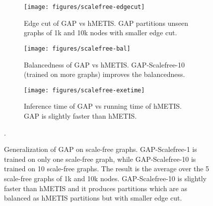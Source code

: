 \documentclass[10pt,twocolumn]{article}
\begin{document}
\begin{figure*}[h]
    \centering
    \begin{subfigure}{0.31\textwidth}
        \texttt{[image: figures/scalefree-edgecut]}
        \caption{\small{Edge cut of GAP vs hMETIS. GAP partitions unseen graphs of 1k and 10k nodes with smaller edge cut.}}
        \label{fig:scalefree-edgecut}
    \end{subfigure}
    \hspace{1mm}
    \begin{subfigure}{0.33\textwidth}
        \texttt{[image: figures/scalefree-bal]}
        \caption{\small{Balancedness of GAP vs hMETIS. GAP-Scalefree-10 (trained on more graphs) improves the balancedness.}}
        \label{fig:scalefree-bal}
    \end{subfigure}
    \hspace{1mm}
    \begin{subfigure}{0.3\textwidth}
        \texttt{[image: figures/scalefree-exetime]}
        \caption{\small{Inference time of GAP vs running time of hMETIS. GAP is slightly faster than hMETIS.}}
        \label{fig:scalefree-exetime}
    \end{subfigure}
\caption{Generalization of GAP on scale-free graphs. GAP-Scalefree-1 is trained on only one scale-free graph, while GAP-Scalefree-10 is trained on 10 scale-free graphs. The result is the average over the 5 scale-free graphs of 1k and 10k nodes. GAP-Scalefree-10 is slightly faster than hMETIS and it produces partitions which are as balanced as hMETIS partitions but with smaller edge cut.}
    \label{fig:scale-free}. 
\end{figure*}
\end{document}
